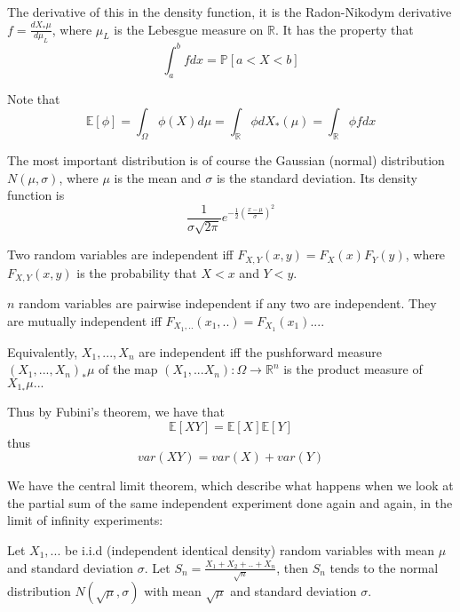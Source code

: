 \documentclass[main.tex]{subfiles}
\begin{document}
The derivative of this in the density function, it is the Radon-Nikodym derivative $f = \frac{d X_*\mu}{d \mu_{L}}$, where $\mu_{L}$ is the Lebesgue measure on $\mathbb{R}$. It has the property that
$$
\int_a ^b f dx = \mathbb{P}[a < X < b]
$$

Note that 
$$
\mathbb{E}[\phi] = \int_\Omega \phi(X) d\mu = \int_\mathbb{R} \phi d X_*(\mu) = \int_\mathbb{R} \phi f dx
$$

\begin{example}
The most important distribution is of course the Gaussian (normal) distribution $N(\mu, \sigma)$, where $\mu$ is the mean and $\sigma$ is the standard deviation. Its density function is 
$$
\frac{1}{\sigma \sqrt{2\pi}} e^{-\frac{1}{2} (\frac{x-\mu}{\sigma} )^2}
$$

\end{example}


\begin{definition}

Two random variables are independent iff $F_{X,Y}(x,y) = F_X(x) F_Y(y)$, where $F_{X,Y}(x,y)$ is the probability that $X < x$ and $Y < y$. 

$n$ random variables are pairwise independent if any two are independent. They are mutually independent iff $F_{X_1, ..}(x_1, ..) = F_{X_1}(x_1) ...$.
\end{definition}

Equivalently, $X_1, ... , X_n$ are independent iff the pushforward measure $(X_1, ..., X_n)_* \mu$ of the map 
$(X_1, ... X_n): \Omega \rightarrow \mathbb{R}^n$ is the product measure of $X_1_* \mu ... $

Thus by Fubini's theorem, we have that
$$
\mathbb{E}[XY] = \mathbb{E}[X] \mathbb{E}[Y]
$$
thus 
$$
var(XY) = var(X) + var(Y)
$$



We have the central limit theorem, which describe what happens when we look at the partial sum of the same independent experiment done again and again, in the limit of infinity experiments:



\begin{theorem}
Let $X_1, ...$ be i.i.d (independent identical density) random variables with mean $\mu$ and standard deviation $\sigma$. Let $S_n = \frac{X_1 + X_2 + .. + X_n}{\sqrt{n}}$, then $S_n$ tends to the normal distribution $N(\sqrt{\mu}, \sigma) $ with mean $\sqrt{\mu}$ and standard deviation $\sigma$. 
\end{theorem}
\end{document}
